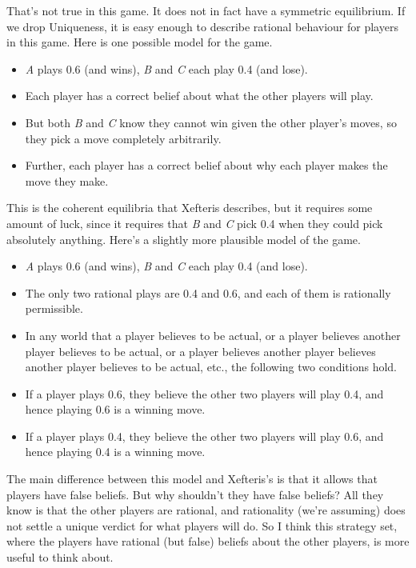 \documentclass[
  12pt,
  letterpaper,
  DIV=11,
  numbers=noendperiod]{scrreprt}
\providecommand{\tightlist}{%
  \setlength{\itemsep}{0pt}\setlength{\parskip}{0pt}}\usepackage{longtable,booktabs,array}
\begin{document}
That's not true in this game. It does not in fact have a symmetric
equilibrium. If we drop Uniqueness, it is easy enough to describe
rational behaviour for players in this game. Here is one possible model
for the game.

\begin{itemize}
\tightlist
\item
  \emph{A} plays 0.6 (and wins), \emph{B} and \emph{C} each play 0.4
  (and lose).
\item
  Each player has a correct belief about what the other players will
  play.
\item
  But both \emph{B} and \emph{C} know they cannot win given the other
  player's moves, so they pick a move completely arbitrarily.
\item
  Further, each player has a correct belief about why each player makes
  the move they make.
\end{itemize}

This is the coherent equilibria that Xefteris describes, but it requires
some amount of luck, since it requires that \emph{B} and \emph{C} pick
0.4 when they could pick absolutely anything. Here's a slightly more
plausible model of the game.

\begin{itemize}
\tightlist
\item
  \emph{A} plays 0.6 (and wins), \emph{B} and \emph{C} each play 0.4
  (and lose).
\item
  The only two rational plays are 0.4 and 0.6, and each of them is
  rationally permissible.
\item
  In any world that a player believes to be actual, or a player believes
  another player believes to be actual, or a player believes another
  player believes another player believes to be actual, etc., the
  following two conditions hold.
\item
  If a player plays 0.6, they believe the other two players will play
  0.4, and hence playing 0.6 is a winning move.
\item
  If a player plays 0.4, they believe the other two players will play
  0.6, and hence playing 0.4 is a winning move.
\end{itemize}

The main difference between this model and Xefteris's is that it allows
that players have false beliefs. But why shouldn't they have false
beliefs? All they know is that the other players are rational, and
rationality (we're assuming) does not settle a unique verdict for what
players will do. So I think this strategy set, where the players have
rational (but false) beliefs about the other players, is more useful to
think about.
\end{document}
